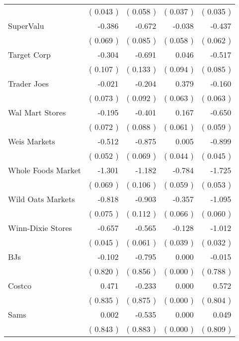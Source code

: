\begin{table}[htbp]
\begin{tabular}{l*{ 4 }{D{.}{.}{-1}}}
& (  0.043 )&(  0.058 )&(  0.037 )&(  0.035 )\\ 
SuperValu  &-0.386 &-0.672 &-0.038 &-0.437 \\ 
& (  0.069 )&(  0.085 )&(  0.058 )&(  0.062 )\\ 
Target Corp &-0.304 &-0.691 & 0.046 &-0.517 \\ 
& (  0.107 )&(  0.133 )&(  0.094 )&(  0.085 )\\ 
Trader Joes  &-0.021 &-0.204 & 0.379 &-0.160 \\ 
& (  0.073 )&(  0.092 )&(  0.063 )&(  0.063 )\\ 
Wal Mart Stores &-0.195 &-0.401 & 0.167 &-0.650 \\ 
& (  0.072 )&(  0.088 )&(  0.061 )&(  0.059 )\\ 
Weis Markets  &-0.512 &-0.875 & 0.005 &-0.899 \\ 
& (  0.052 )&(  0.069 )&(  0.044 )&(  0.045 )\\ 
Whole Foods Market &-1.301 &-1.182 &-0.784 &-1.725 \\ 
& (  0.069 )&(  0.106 )&(  0.059 )&(  0.053 )\\ 
Wild Oats Markets  &-0.818 &-0.903 &-0.357 &-1.095 \\ 
& (  0.075 )&(  0.112 )&(  0.066 )&(  0.060 )\\ 
Winn-Dixie Stores  &-0.657 &-0.565 &-0.128 &-1.012 \\ 
& (  0.045 )&(  0.061 )&(  0.039 )&(  0.032 )\\ 
BJs &-0.102 &-0.795 & 0.000 &-0.015 \\ 
& (  0.820 )&(  0.856 )&(  0.000 )&(  0.788 )\\ 
Costco & 0.471 &-0.233 & 0.000 & 0.572 \\ 
& (  0.835 )&(  0.875 )&(  0.000 )&(  0.804 )\\ 
Sams & 0.002 &-0.535 & 0.000 & 0.049 \\ 
& (  0.843 )&(  0.883 )&(  0.000 )&(  0.809 )\\ 
\midrule\bottomrule\end{tabular}\end{table}